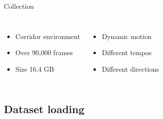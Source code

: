 \documentclass{beamer}
\newcounter{section}
\begin{document}
\begin{frame}[t]{Collection}
    \vspace{-0.6\baselineskip}

    \begin{columns}[t,onlytextwidth]
        \begin{itemize}
			\item Corridor environment
			\item Over 90,000 frames
            \item Size 16.4 GB
		\end{itemize}
		\begin{itemize}
			\item Dynamic motion
			\item Different tempos
            \item Different directions
		\end{itemize}	
	\end{columns}
    
\end{frame}



\subsection{Dataset loading}

        
\end{document}
